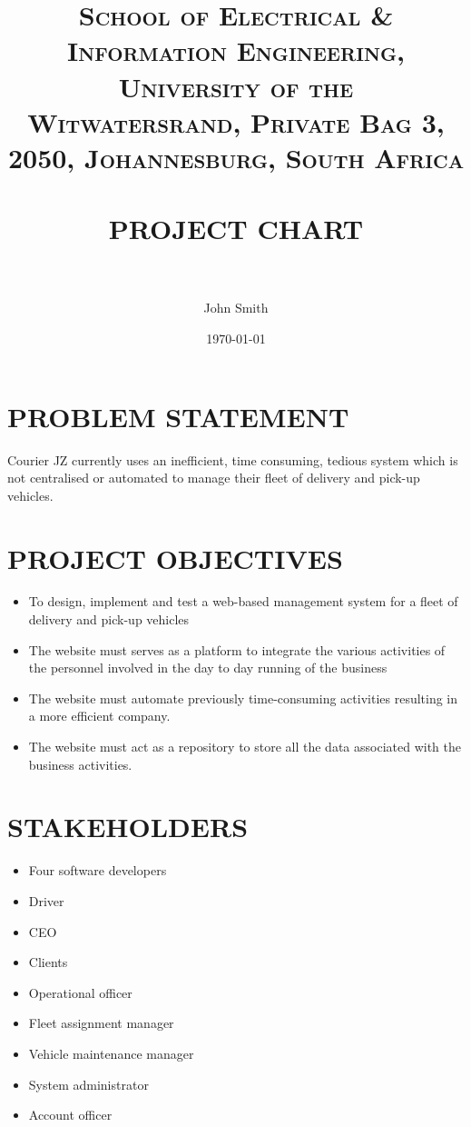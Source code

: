 \documentclass[paper=a4, fontsize=11pt]{scrartcl} %
\title{	
\normalfont \normalsize 
\textsc{School of Electrical \& Information Engineering, University of the
Witwatersrand, Private Bag 3, 2050, Johannesburg, South Africa} \\ [25pt] %
\horrule{0.5pt} \\[0.4cm] %
\huge PROJECT CHART \\ %
\horrule{2pt} \\[0.5cm] %
}
\author{John Smith} %
\date{\normalsize\today} %
\numberwithin{equation}{section} %
\numberwithin{figure}{section} %
\numberwithin{table}{section} %
\begin{document}
\maketitle %
\section{PROBLEM STATEMENT}

Courier JZ currently uses an inefficient, time consuming, tedious system which is not centralised or automated to manage their fleet of delivery and pick-up vehicles.


%
\section{PROJECT OBJECTIVES}

\begin{itemize}
\item To design, implement and test a web-based management system for a fleet of delivery and pick-up vehicles
\item The website must serves as a platform to integrate the various activities of the personnel involved in the day to day running of the business
\item The website must automate previously time-consuming activities resulting in a  more efficient company.
\item The website must act as a repository  to store all the data associated with the business activities.
\end{itemize}

\section{ STAKEHOLDERS}
\begin{itemize}
\item Four software developers
\item Driver
\item CEO
\item Clients
\item Operational officer
\item Fleet assignment manager
\item Vehicle maintenance manager
\item System administrator
\item Account officer
\end{itemize}
\end{document}
